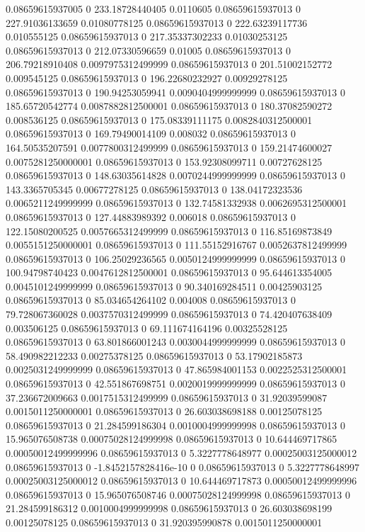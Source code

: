 0.08659615937005 0 233.18728440405 0.0110605
0.08659615937013 0 227.91036133659 0.01080778125
0.08659615937013 0 222.63239117736 0.010555125
0.08659615937013 0 217.35337302233 0.01030253125
0.08659615937013 0 212.07330596659 0.01005
0.08659615937013 0 206.79218910408 0.0097975312499999
0.08659615937013 0 201.51002152772 0.009545125
0.08659615937013 0 196.22680232927 0.00929278125
0.08659615937013 0 190.94253059941 0.0090404999999999
0.08659615937013 0 185.65720542774 0.0087882812500001
0.08659615937013 0 180.37082590272 0.008536125
0.08659615937013 0 175.08339111175 0.0082840312500001
0.08659615937013 0 169.79490014109 0.008032
0.08659615937013 0 164.50535207591 0.0077800312499999
0.08659615937013 0 159.21474600027 0.0075281250000001
0.08659615937013 0 153.92308099711 0.00727628125
0.08659615937013 0 148.63035614828 0.0070244999999999
0.08659615937013 0 143.3365705345 0.00677278125
0.08659615937013 0 138.04172323536 0.0065211249999999
0.08659615937013 0 132.74581332938 0.0062695312500001
0.08659615937013 0 127.44883989392 0.006018
0.08659615937013 0 122.15080200525 0.0057665312499999
0.08659615937013 0 116.85169873849 0.0055151250000001
0.08659615937013 0 111.55152916767 0.0052637812499999
0.08659615937013 0 106.25029236565 0.0050124999999999
0.08659615937013 0 100.94798740423 0.0047612812500001
0.08659615937013 0 95.644613354005 0.0045101249999999
0.08659615937013 0 90.340169284511 0.00425903125
0.08659615937013 0 85.034654264102 0.004008
0.08659615937013 0 79.728067360028 0.0037570312499999
0.08659615937013 0 74.420407638409 0.003506125
0.08659615937013 0 69.111674164196 0.00325528125
0.08659615937013 0 63.801866001243 0.0030044999999999
0.08659615937013 0 58.490982212233 0.00275378125
0.08659615937013 0 53.17902185873 0.0025031249999999
0.08659615937013 0 47.865984001153 0.0022525312500001
0.08659615937013 0 42.551867698751 0.0020019999999999
0.08659615937013 0 37.236672009663 0.0017515312499999
0.08659615937013 0 31.92039599087 0.0015011250000001
0.08659615937013 0 26.603038698188 0.00125078125
0.08659615937013 0 21.284599186304 0.0010004999999998
0.08659615937013 0 15.965076508738 0.00075028124999998
0.08659615937013 0 10.644469717865 0.00050012499999996
0.08659615937013 0 5.3227778648977 0.00025003125000012
0.08659615937013 0 -1.8452157828416e-10 0
0.08659615937013 0 5.3227778648997 0.00025003125000012
0.08659615937013 0 10.644469717873 0.00050012499999996
0.08659615937013 0 15.965076508746 0.00075028124999998
0.08659615937013 0 21.284599186312 0.0010004999999998
0.08659615937013 0 26.603038698199 0.00125078125
0.08659615937013 0 31.920395990878 0.0015011250000001
